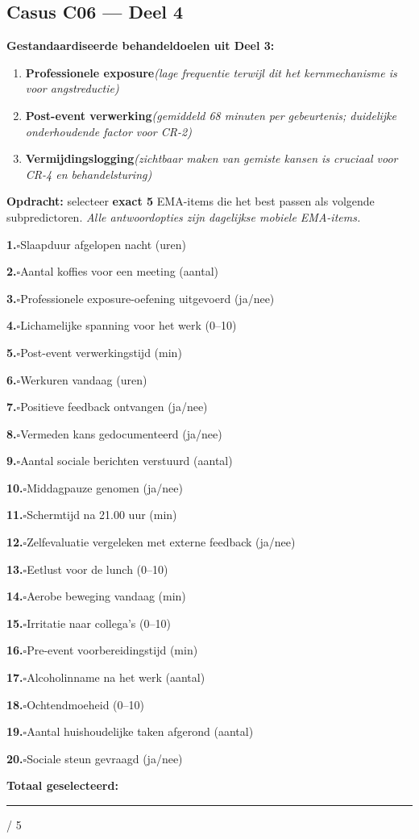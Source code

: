 \documentclass[11pt,a4paper]{article}
\newcommand{\checkitemBFS}[2]{%
\noindent\small\textbf{#1.}\hspace{0.45em}$\square$\hspace{0.4em}#2\par\vspace{0.20em}}
\begin{document}
\vspace{0.6em}
\newpage
\subsection*{Casus C06 --- Deel 4}

\begin{contextbox}
\small\textbf{Gestandaardiseerde behandeldoelen uit Deel 3:}
\begin{enumerate}[topsep=2pt,itemsep=1pt,label=\arabic*.]
\item \textbf{Professionele exposure}\quad\textit{\small (lage frequentie terwijl dit het kernmechanisme is voor angstreductie)}
\item \textbf{Post-event verwerking}\quad\textit{\small (gemiddeld 68 minuten per gebeurtenis; duidelijke onderhoudende factor voor CR-2)}
\item \textbf{Vermijdingslogging}\quad\textit{\small (zichtbaar maken van gemiste kansen is cruciaal voor CR-4 en behandelsturing)}
\end{enumerate}
\end{contextbox}

\begin{responsebox}
\small\textbf{Opdracht:} selecteer \textbf{exact 5} EMA-items die het best passen als volgende subpredictoren.
\textit{Alle antwoordopties zijn dagelijkse mobiele EMA-items.}

\checkitemBFS{1}{Slaapduur afgelopen nacht (uren)}
\checkitemBFS{2}{Aantal koffies voor een meeting (aantal)}
\checkitemBFS{3}{Professionele exposure-oefening uitgevoerd (ja/nee)}
\checkitemBFS{4}{Lichamelijke spanning voor het werk (0--10)}
\checkitemBFS{5}{Post-event verwerkingstijd (min)}
\checkitemBFS{6}{Werkuren vandaag (uren)}
\checkitemBFS{7}{Positieve feedback ontvangen (ja/nee)}
\checkitemBFS{8}{Vermeden kans gedocumenteerd (ja/nee)}
\checkitemBFS{9}{Aantal sociale berichten verstuurd (aantal)}
\checkitemBFS{10}{Middagpauze genomen (ja/nee)}
\checkitemBFS{11}{Schermtijd na 21.00 uur (min)}
\checkitemBFS{12}{Zelfevaluatie vergeleken met externe feedback (ja/nee)}
\checkitemBFS{13}{Eetlust voor de lunch (0--10)}
\checkitemBFS{14}{Aerobe beweging vandaag (min)}
\checkitemBFS{15}{Irritatie naar collega's (0--10)}
\checkitemBFS{16}{Pre-event voorbereidingstijd (min)}
\checkitemBFS{17}{Alcoholinname na het werk (aantal)}
\checkitemBFS{18}{Ochtendmoeheid (0--10)}
\checkitemBFS{19}{Aantal huishoudelijke taken afgerond (aantal)}
\checkitemBFS{20}{Sociale steun gevraagd (ja/nee)}
\vspace{0.4em}
\noindent\textbf{Totaal geselecteerd:}\hspace{0.5em}\rule{1.2cm}{0.25pt}\hspace{0.2em}/ 5
\end{responsebox}
\end{document}
